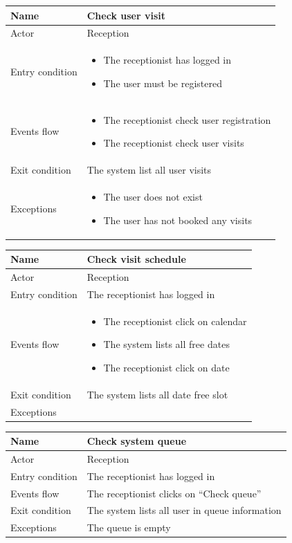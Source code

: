  \begin{tabular}{|p{5cm} | p{7cm} | }
 	\hline
 	Name & Check user visit  \\
 	\hline
 	Actor & Reception \\
 	\hline
 	Entry condition &
 	\begin{itemize}
 		\item The receptionist has logged in 
 		\item The user must be registered
 	\end{itemize} \\
 	\hline
 	Events flow & 
 	\begin{itemize}
 		\item The receptionist check user registration
 		\item The receptionist check user visits
 	\end{itemize} \\
 	\hline
 	Exit condition &
 	The system list all user visits \\
 	\hline 
 	Exceptions & 
 	\begin{itemize}
 		\item The user does not exist
 		\item The user has not booked any visits
 	\end{itemize} \\
 	\hline
 \end{tabular}


\begin{tabular}{|p{5cm} | p{7cm} | }
	\hline
	Name & Check visit schedule \\
	\hline
	Actor & Reception \\
	\hline
	Entry condition & 
	The receptionist has logged in \\
	\hline
	Events flow & 
	\begin{itemize}
		\item The receptionist click on calendar
		\item The system lists all free dates
		\item The receptionist click on date
	\end{itemize} \\
	\hline
	Exit condition &
	The system lists all date free slot \\
	\hline 
	Exceptions & \\
	\hline
\end{tabular}

\begin{tabular}{|p{5cm} | p{7cm} | }
	\hline
	Name & Check system queue \\
	\hline
	Actor & Reception \\
	\hline
	Entry condition & 
	The receptionist has logged in  \\
	\hline
	Events flow & 
	The receptionist clicks on “Check queue”  \\
	\hline
	Exit condition &
	The system lists all user in queue information \\
	\hline 
	Exceptions & The queue is empty \\
	\hline
\end{tabular}

